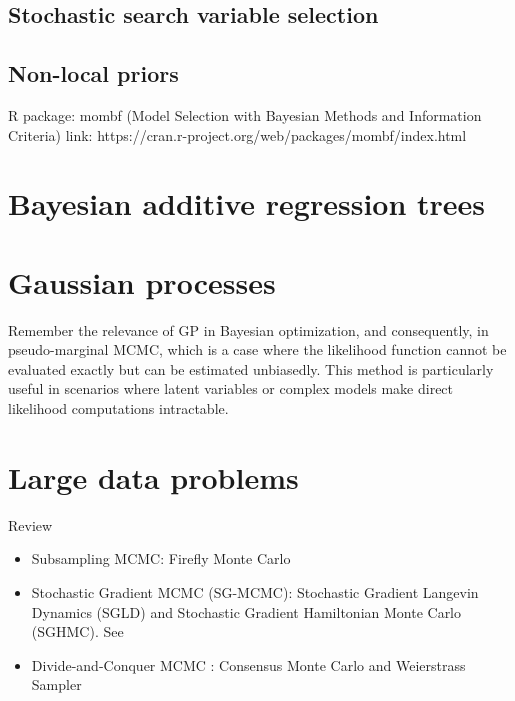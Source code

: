 \subsection{Stochastic search variable selection}\label{sec13_22}

\subsection{Non-local priors}\label{sec13_23}

\cite{johnson2012bayesian}
R package: mombf (Model Selection with Bayesian Methods and Information Criteria)
link: https://cran.r-project.org/web/packages/mombf/index.html

\section{Bayesian additive regression trees}\label{sec13_3}

\section{Gaussian processes}\label{13_4}

Remember the relevance of GP in Bayesian optimization, and consequently, in pseudo-marginal MCMC, which is a case where the likelihood function cannot be evaluated exactly but can be estimated unbiasedly. This method is particularly useful in scenarios where latent variables or complex models make direct likelihood computations intractable.

\section{Large data problems}\label{13_5}
Review \cite{bardenet2017markov}
\begin{itemize}
	\item Subsampling MCMC: Firefly Monte Carlo \cite{Maclaurin2015}
	\item Stochastic Gradient MCMC (SG-MCMC): Stochastic Gradient Langevin Dynamics (SGLD) and Stochastic Gradient Hamiltonian Monte Carlo (SGHMC). See \cite{nemeth2021stochastic,song2020extended,baker2019sgmcmc,chen2014stochastic,welling2011bayesian}
	\item Divide-and-Conquer MCMC \cite{quiroz2018subsampling,quiroz2019speeding}: Consensus Monte Carlo \cite{rendell2020global,scott2022bayes} and Weierstrass Sampler \cite{wu2017average}
\end{itemize}

